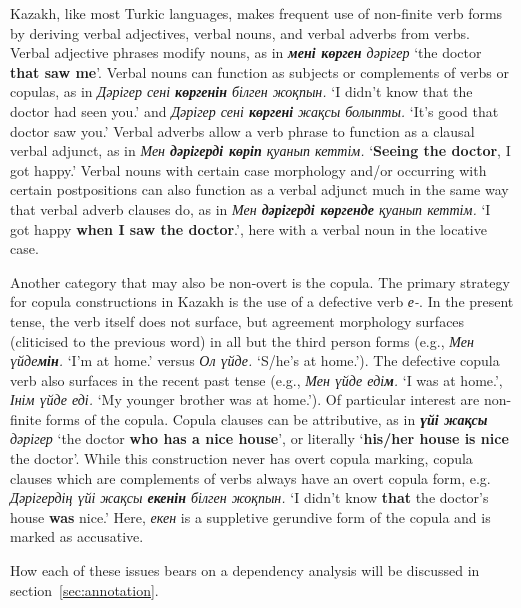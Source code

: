 \documentclass[a4paper,11pt, onecolumn,twoside]{article}
\newcommand{\kazakh}[1]{{\em #1}}
\newcommand{\gloss}[1]{`#1'}
\begin{document}
Kazakh, like most Turkic languages, makes frequent use of non-finite verb forms by deriving verbal adjectives, verbal nouns, and verbal adverbs from verbs.  Verbal adjective phrases modify nouns, as in \kazakh{\textbf{мені көрген} дәрігер} \gloss{the doctor \textbf{that saw me}}.  Verbal nouns can function as subjects or complements of verbs or copulas, as in \kazakh{Дәрігер сені \textbf{көргенін} білген жоқпын.} \gloss{I didn't know that the doctor had seen you.} and \kazakh{Дәрігер сені \textbf{көргені} жақсы болыпты.} \gloss{It's good that doctor saw you.}  Verbal adverbs allow a verb phrase to function as a clausal verbal adjunct, as in \kazakh{Мен \textbf{дәрігерді көріп} қуанып кеттім.} \gloss{\textbf{Seeing the doctor}, I got happy.}  Verbal nouns with certain case morphology and/or occurring with certain postpositions can also function as a verbal adjunct much in the same way that verbal adverb clauses do, as in \kazakh{Мен \textbf{дәрігерді көргенде} қуанып кеттім.} \gloss{I got happy \textbf{when I saw the doctor}.}, here with a verbal noun in the locative case.

Another category that may also be non-overt is the copula.  The primary strategy for copula constructions in Kazakh is the use of a defective verb \kazakh{е-}.  In the present tense, the verb itself does not surface, but agreement morphology surfaces (cliticised to the previous word) in all but the third person forms (e.g., \kazakh{Мен үйде\textbf{мін}.} \gloss{I'm at home.} versus \kazakh{Ол үйде.} \gloss{S/he's at home.}).  The defective copula verb also surfaces in the recent past tense (e.g., \kazakh{Мен үйде еді\textbf{м}.} \gloss{I was at home.}, \kazakh{Інім үйде еді.} \gloss{My younger brother was at home.}).  Of particular interest are non-finite forms of the copula.  Copula clauses can be attributive, as in \kazakh{\textbf{үйі жақсы} дәрігер} \gloss{the doctor \textbf{who has a nice house}}, or literally \gloss{\textbf{his/her house is nice} the doctor}.  While this construction never has overt copula marking, copula clauses which are complements of verbs always have an overt copula form, e.g. \kazakh{Дәрігердің үйі жақсы \textbf{екенін} білген жоқпын.} \gloss{I didn't know \textbf{that} the doctor's house \textbf{was} nice.}  Here, \kazakh{екен} is a suppletive gerundive form of the copula and is marked as accusative.


How each of these issues bears on a dependency analysis will be discussed in section~\ref{sec:annotation}.

\end{document}
